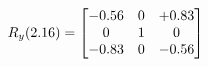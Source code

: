 \documentclass[preview]{standalone}
\begin{document}
\begin{align*}
\special{dvisvgm:raw <g id='unique000'>}R_{y}(2.16) = \begin{bmatrix}-0.56 & 0 & +0.83 \\0 & 1 & 0 \\-0.83 & 0 & -0.56\end{bmatrix}\special{dvisvgm:raw </g>}
\end{align*}
\end{document}
